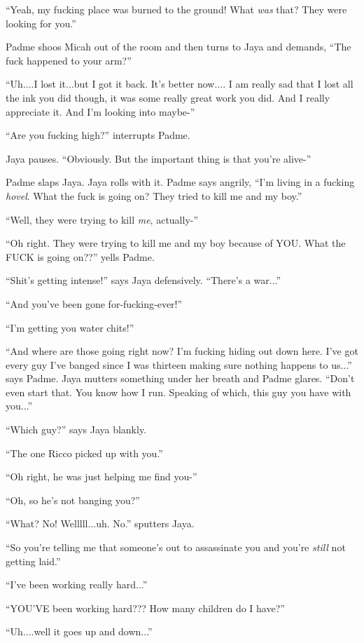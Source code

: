 ``Yeah, my fucking place was burned to the ground!  What \textit{was }that?  They were looking for you.''

Padme shoos Micah out of the room and then turns to Jaya and demands, ``The fuck happened to your arm?''

``Uh....I lost it...but I got it back.  It's better now.... I am really sad that I lost all the ink you did though, it was some really great work you did.  And I really appreciate it.  And I'm looking into maybe-''

``Are you fucking high?'' interrupts Padme.

Jaya pauses.  ``Obviously.  But the important thing is that you're alive-''

Padme slaps Jaya.  Jaya rolls with it.   Padme says angrily, ``I'm living in a fucking \textit{hovel}.  What the fuck is going on?  They tried to kill me and my boy.''

``Well, they were trying to kill \textit{me}, actually-''

``Oh right.  They were trying to kill me and my boy because of YOU.  What the FUCK is going on??'' yells Padme.

``Shit's getting intense!'' says Jaya defensively.  ``There's a war...''

``And you've been gone for-fucking-ever!''

``I'm getting you water chits!''

``And where are those going right now?  I'm fucking hiding out down here.  I've got every guy I've banged since I was thirteen making sure nothing happens to us...'' says Padme.  Jaya mutters something under her breath and Padme glares. ``Don't even start that.  You know how I run.  Speaking of which, this guy you have with you...''

``Which guy?'' says Jaya blankly.

``The one Ricco picked up with you.''

``Oh right, he was just helping me find you-''

``Oh, so he's not banging you?''

``What?  No!  Welllll...uh.  No.'' sputters Jaya.

``So you're telling me that someone's out to assassinate you and you're \textit{still} not getting laid.''

``I've been working really hard...''

``YOU'VE been working hard???  How many children do I have?''

``Uh....well it goes up and down...''

